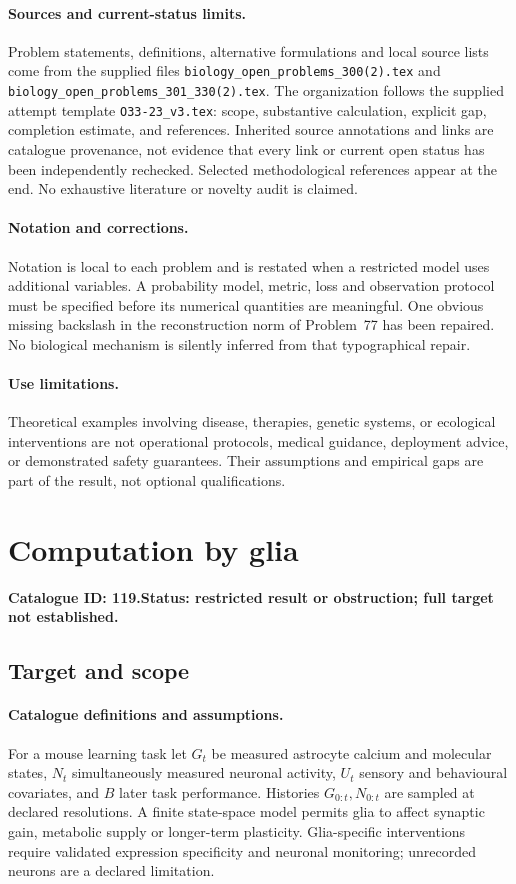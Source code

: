 \documentclass[11pt]{article}
\begin{document}
\paragraph{Sources and current-status limits.}
Problem statements, definitions, alternative formulations and local source lists
come from the supplied files
\texttt{biology\_open\_problems\_300(2).tex} and
\texttt{biology\_open\_problems\_301\_330(2).tex}.
The organization follows the supplied attempt template
\texttt{O33-23\_v3.tex}: scope, substantive calculation, explicit gap,
completion estimate, and references. Inherited source annotations and links are
catalogue provenance, not evidence that every link or current open status has
been independently rechecked. Selected methodological references appear at the
end. No exhaustive literature or novelty audit is claimed.

\paragraph{Notation and corrections.}
Notation is local to each problem and is restated when a restricted model uses
additional variables. A probability model, metric, loss and observation protocol
must be specified before its numerical quantities are meaningful. One obvious
missing backslash in the reconstruction norm of Problem~77 has been repaired.
No biological mechanism is silently inferred from that typographical repair.

\paragraph{Use limitations.}
Theoretical examples involving disease, therapies, genetic systems, or ecological
interventions are not operational protocols, medical guidance, deployment advice,
or demonstrated safety guarantees. Their assumptions and empirical gaps are part
of the result, not optional qualifications.

\setcounter{section}{118}
\section{Computation by glia}
\label{prob:119}
\noindent\textbf{Catalogue ID: 119.}\quad \textbf{Status: restricted result or obstruction; full target not established.}
\subsection{Target and scope}
\paragraph{Catalogue definitions and assumptions.}
For a mouse learning task let $G_t$ be measured astrocyte calcium and molecular states, $N_t$ simultaneously measured neuronal activity, $U_t$ sensory and behavioural covariates, and $B$ later task performance. Histories $G_{0:t},N_{0:t}$ are sampled at declared resolutions. A finite state-space model permits glia to affect synaptic gain, metabolic supply or longer-term plasticity. Glia-specific interventions require validated expression specificity and neuronal monitoring; unrecorded neurons are a declared limitation.
\end{document}
